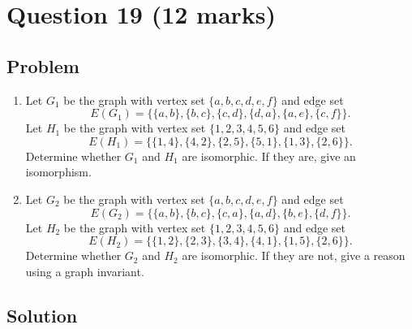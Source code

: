 \documentclass[12pt]{article}
\begin{document}
\newpage
\section{Question 19 \hfill (12 marks)}
\subsection{Problem}

\begin{enumerate}[label=(\alph*)]
    \item Let $G_1$ be the graph with vertex set $\{a,b,c,d,e,f\}$ and edge set
    \[
    E(G_1)=\bigl\{\{a,b\},\{b,c\},\{c,d\},\{d,a\},\{a,e\},\{c,f\}\bigr\}.
    \]
    Let $H_1$ be the graph with vertex set $\{1,2,3,4,5,6\}$ and edge set
    \[
    E(H_1)=\bigl\{\{1,4\},\{4,2\},\{2,5\},\{5,1\},\{1,3\},\{2,6\}\bigr\}.
    \]
    Determine whether $G_1$ and $H_1$ are isomorphic. If they are, give an isomorphism.

    \item Let $G_2$ be the graph with vertex set $\{a,b,c,d,e,f\}$ and edge set
    \[
    E(G_2)=\bigl\{\{a,b\},\{b,c\},\{c,a\},\{a,d\},\{b,e\},\{d,f\}\bigr\}.
    \]
    Let $H_2$ be the graph with vertex set $\{1,2,3,4,5,6\}$ and edge set
    \[
    E(H_2)=\bigl\{\{1,2\},\{2,3\},\{3,4\},\{4,1\},\{1,5\},\{2,6\}\bigr\}.
    \]
    Determine whether $G_2$ and $H_2$ are isomorphic. If they are not, give a reason using a graph invariant.
\end{enumerate}

\subsection{Solution}
\end{document}
